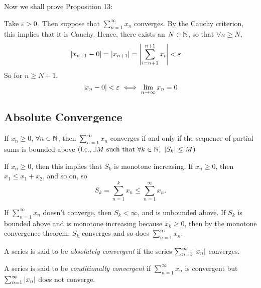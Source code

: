 \documentclass[12pt]{article}
\theoremstyle{definition}
\renewenvironment{proof}[1][\proofname]{\vspace{-10pt}\begin{replacementproof}}{\end{replacementproof}}
\newcommand{\xseries}{\sum_{n = 1}^{\infty}x_{n}}
\newcommand{\nlim}{\lim_{n\rightarrow\infty}}
\begin{document}
            Now we shall prove Proposition 13:
            \begin{proof}
                Take $\varepsilon > 0$. Then suppose that $\xseries$ converges. By the Cauchy criterion, this implies that it is Cauchy. Hence, there exists an $N \in \mathbb{N}$, so that $\forall n \geq N$, 
                \begin{align*}
                    \left|x_{n + 1} - 0\right| = \left|x_{n + 1}\right| &= \left|\sum_{i = n + 1}^{n + 1}x_{i}\right| < \varepsilon.
                \end{align*}
                So for $n \geq N + 1$, 
                \begin{equation*}
                    \abs{x_{n} - 0} < \varep ~ \Longleftrightarrow ~ \nlim x_{n} = 0
                \end{equation*}
            \end{proof}

        \subsection{Absolute Convergence}
            \begin{prop}
                If $x_n \geq 0$, $\forall n \in \mathbb{N}$, then $\xseries$ converges if and only if the sequence of partial sums is bounded above $\left(\text{i.e.}, \exists M ~ \text{such that} ~ \forall k \in \mathbb{N}, ~ \left|S_{k}\right| \leq M\right)$
            \end{prop}
            \begin{remark}
                If $x_n \geq 0$, then this implies that $S_{k}$ is monotone increasing. If $x_{n} \geq 0$, then $x_{1} \leq x_{1} + x_{2}$, and so on, so
                \begin{equation*}
                    S_{k} = \sum_{n = 1}^{k}x_{n} \leq \xseries.
                \end{equation*}

                If $\xseries$ doesn't converge, then $S_{k} < \infty$, and is unbounded above. If $S_{k}$ is bounded above and is monotone increasing because $x_{k} \geq 0$, then by the monotone convergence theorem, $S_{k}$ converges and so does $\xseries$. 
            \end{remark}
            \begin{definition}
                A series is said to be \emph{absolutely convergent} if the series $\sum_{n = 1}^{\infty}\left|x_{n}\right|$ converges. 
            \end{definition}
            \begin{definition}
               A series is said to be \emph{conditionally convergent} if $\xseries$ is convergent but $\sum_{n = 1}^{\infty}\left|x_{n}\right|$ does not converge.
            \end{definition}
\end{document}
